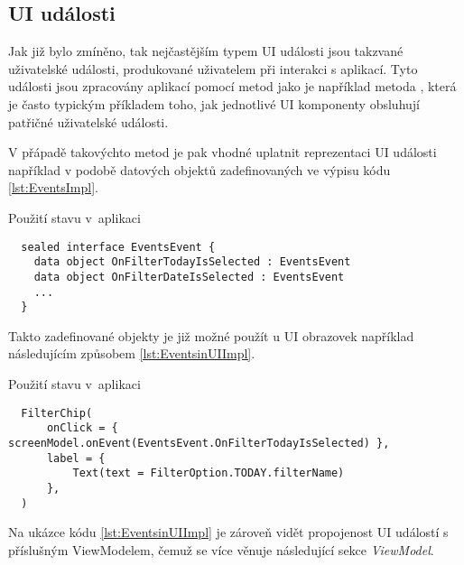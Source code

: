 \subsection{UI události} \label{eventHandlingImpl}

Jak již bylo zmíněno, tak nejčastějším typem UI události jsou takzvané uživatelské události, produkované uživatelem při interakci s aplikací.
Tyto události jsou zpracovány aplikací pomocí metod jako je například metoda , která je často typickým příkladem toho, jak
jednotlivé UI komponenty obsluhují patřičné uživatelské události. 

V přápadě takovýchto metod je pak vhodné uplatnit reprezentaci UI události například v podobě datových objektů 
zadefinovaných ve výpisu kódu \ref{lst:EventsImpl}.

\begin{listing}[H]
\caption{Použití stavu v~aplikaci}\label{lst:EventsImpl}
\begin{verbatim}
  sealed interface EventsEvent {
    data object OnFilterTodayIsSelected : EventsEvent
    data object OnFilterDateIsSelected : EventsEvent
    ...
  }
\end{verbatim}
\end{listing}

Takto zadefinované objekty je již možné použít u UI obrazovek například následujícím způsobem \ref{lst:EventsinUIImpl}.

\begin{listing}[H]
\caption{Použití stavu v~aplikaci}\label{lst:EventsinUIImpl}
\begin{verbatim}
  FilterChip(
      onClick = { screenModel.onEvent(EventsEvent.OnFilterTodayIsSelected) },
      label = {
          Text(text = FilterOption.TODAY.filterName)
      },
  )
\end{verbatim}
\end{listing}

Na ukázce kódu \ref{lst:EventsinUIImpl} je zároveň vidět propojenost UI událostí s příslušným ViewModelem, čemuž se více věnuje následující
sekce \textit{ViewModel}.






